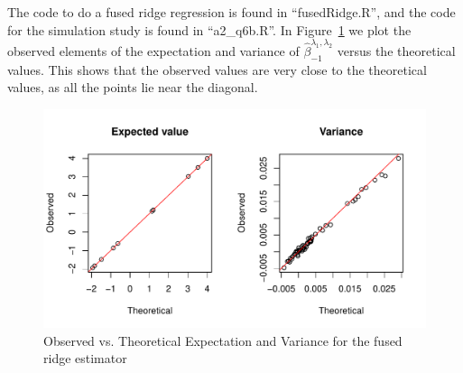 \documentclass{article}\usepackage[]{graphicx}\usepackage[]{color}
\makeatletter
\def\maxwidth{ %
  \ifdim\Gin@nat@width>\linewidth
    \linewidth
  \else
    \Gin@nat@width
  \fi
}
\newenvironment{knitrout}{}{} %
\makeatother
\begin{document}
The code to do a fused ridge regression is found in ``fusedRidge.R'', and the code for the simulation study is found in ``a2\_q6b.R''.  In Figure~\ref{fig:q6_graphs} we plot the observed elements of the expectation and variance of $\hat{\beta}^{\lambda_1,\lambda_2}_{-1}$ versus the theoretical values.  This shows that the  observed values are very close to the theoretical values, as all the points lie near the diagonal.

\begin{knitrout}
\color{fgcolor}\begin{figure}
\includegraphics[width=\maxwidth]{figure/q6_graphs-1} \caption[Observed vs]{Observed vs. Theoretical Expectation and Variance for the fused ridge estimator}\label{fig:q6_graphs}
\end{figure}


\end{knitrout}
\end{document}

